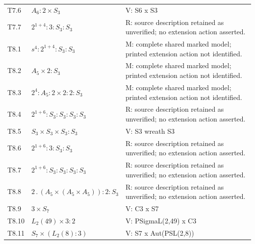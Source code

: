 \begin{longtable}{@{}lp{.40\linewidth}p{.46\linewidth}@{}}
T7.6 & $A_{6} : 2 \times S_{3}$ & V: S6 x S3\\
T7.7 & $2^{1+4} : 3 : S_{3} : S_{3}$ & R: source description retained as unverified; no extension action asserted.\\
T8.1 & $s^4 : 2^{1+4} : S_{3} : S_{3}$ & M: complete shared marked model; printed extension action not identified.\\
T8.2 & $A_{5} \times 2 : S_{3}$ & M: complete shared marked model; printed extension action not identified.\\
T8.3 & $2^4 : A_{5} : 2 \times 2 : 2 : S_{3}$ & M: complete shared marked model; printed extension action not identified.\\
T8.4 & $2^{1+6} : S_{3} : S_{3} : S_{3} : S_{3}$ & R: source description retained as unverified; no extension action asserted.\\
T8.5 & $S_{3} \times S_{3} \times S_{3} : S_{3}$ & V: S3 wreath S3\\
T8.6 & $2^{1+6} : 3 : S_{3} : S_{3}$ & R: source description retained as unverified; no extension action asserted.\\
T8.7 & $2^{1+6} : S_{3} : S_{3} : S_{3} : S_{3}$ & R: source description retained as unverified; no extension action asserted.\\
T8.8 & $2 \mathbin{.} (A_{5} \times (A_{5} \times A_{5})) : 2 : S_{3}$ & R: source description retained as unverified; no extension action asserted.\\
T8.9 & $3 \times S_{7}$ & V: C3 x S7\\
T8.10 & $L_{2}(49) \times 3 : 2$ & V: PSigmaL(2,49) x C3\\
T8.11 & $S_{7} \times (L_{2}(8) : 3)$ & V: S7 x Aut(PSL(2,8))\\
\bottomrule\end{longtable}
